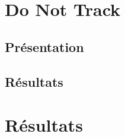 \section{Do Not Track}
\subsection{Présentation}
\subsection{Résultats}


\section{Résultats}
\label{results_plugins}

